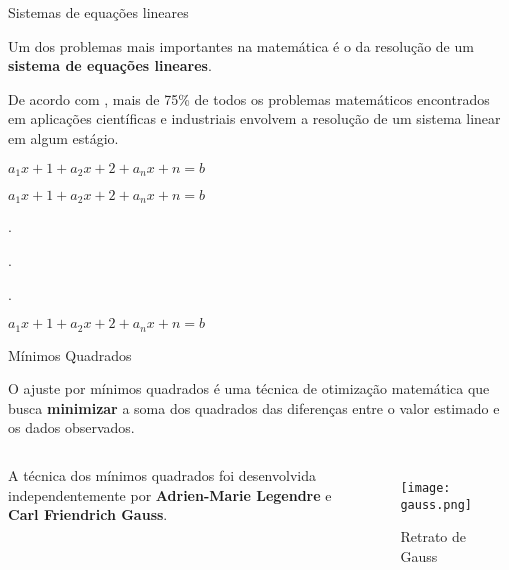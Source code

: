 \begin{frame}[t]{Sistemas de equações lineares} 

   Um dos problemas mais importantes na matemática é o da resolução de um \textbf{sistema de equações lineares}. 
   
   De acordo com \cite{leon2000algebra}, mais de 75\% de todos os problemas matemáticos encontrados em aplicações científicas e industriais envolvem a resolução de um sistema linear em algum estágio.

   \vspace*{0.45cm}

   \centering

   $a_{1}x+{1} + a_{2}x+{2} + a_{n}x+{n} = b$

   $a_{1}x+{1} + a_{2}x+{2} + a_{n}x+{n} = b$

   .

   .

   .

   $a_{1}x+{1} + a_{2}x+{2} + a_{n}x+{n} = b$

\end{frame}
\begin{frame}[t]{Mínimos Quadrados} 

    O ajuste por mínimos quadrados é uma técnica de otimização matemática que busca \textbf{minimizar} a soma dos quadrados das diferenças entre o valor estimado e os dados observados.
 
    \vspace*{0.45cm}
 
\begin{columns}[c]
    \centering
    A técnica dos mínimos quadrados foi desenvolvida independentemente por \textbf{Adrien-Marie Legendre} e \textbf{Carl Friendrich Gauss}.
   \centering
   \begin{figure}
    \texttt{[image: gauss.png]}
    \caption{Retrato de Gauss}
    \end{figure}
\end{columns}

 \end{frame}
